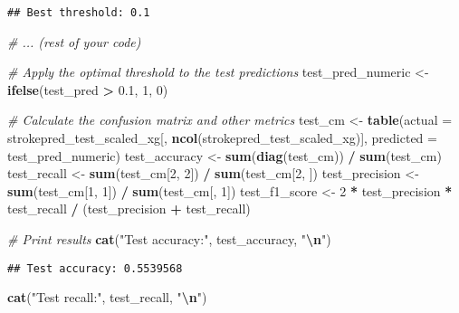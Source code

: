 \documentclass[
]{article}
\newenvironment{Shaded}{\begin{snugshade}}{\end{snugshade}}
\newcommand{\AttributeTok}[1]{\textcolor[rgb]{0.13,0.29,0.53}{#1}}
\newcommand{\CommentTok}[1]{\textcolor[rgb]{0.56,0.35,0.01}{\textit{#1}}}
\newcommand{\DecValTok}[1]{\textcolor[rgb]{0.00,0.00,0.81}{#1}}
\newcommand{\FloatTok}[1]{\textcolor[rgb]{0.00,0.00,0.81}{#1}}
\newcommand{\FunctionTok}[1]{\textcolor[rgb]{0.13,0.29,0.53}{\textbf{#1}}}
\newcommand{\NormalTok}[1]{#1}
\newcommand{\OtherTok}[1]{\textcolor[rgb]{0.56,0.35,0.01}{#1}}
\newcommand{\SpecialCharTok}[1]{\textcolor[rgb]{0.81,0.36,0.00}{\textbf{#1}}}
\newcommand{\StringTok}[1]{\textcolor[rgb]{0.31,0.60,0.02}{#1}}
\begin{document}
\begin{verbatim}
## Best threshold: 0.1
\end{verbatim}

\begin{Shaded}
\begin{Highlighting}[]
\CommentTok{\# ... (rest of your code)}

\CommentTok{\# Apply the optimal threshold to the test predictions}
\NormalTok{test\_pred\_numeric }\OtherTok{\textless{}{-}} \FunctionTok{ifelse}\NormalTok{(test\_pred }\SpecialCharTok{\textgreater{}} \FloatTok{0.1}\NormalTok{, }\DecValTok{1}\NormalTok{, }\DecValTok{0}\NormalTok{)}

\CommentTok{\# Calculate the confusion matrix and other metrics}
\NormalTok{test\_cm }\OtherTok{\textless{}{-}} \FunctionTok{table}\NormalTok{(}\AttributeTok{actual =}\NormalTok{ strokepred\_test\_scaled\_xg[, }\FunctionTok{ncol}\NormalTok{(strokepred\_test\_scaled\_xg)], }\AttributeTok{predicted =}\NormalTok{ test\_pred\_numeric)}
\NormalTok{test\_accuracy }\OtherTok{\textless{}{-}} \FunctionTok{sum}\NormalTok{(}\FunctionTok{diag}\NormalTok{(test\_cm)) }\SpecialCharTok{/} \FunctionTok{sum}\NormalTok{(test\_cm)}
\NormalTok{test\_recall }\OtherTok{\textless{}{-}} \FunctionTok{sum}\NormalTok{(test\_cm[}\DecValTok{2}\NormalTok{, }\DecValTok{2}\NormalTok{]) }\SpecialCharTok{/} \FunctionTok{sum}\NormalTok{(test\_cm[}\DecValTok{2}\NormalTok{, ])}
\NormalTok{test\_precision }\OtherTok{\textless{}{-}} \FunctionTok{sum}\NormalTok{(test\_cm[}\DecValTok{1}\NormalTok{, }\DecValTok{1}\NormalTok{]) }\SpecialCharTok{/} \FunctionTok{sum}\NormalTok{(test\_cm[, }\DecValTok{1}\NormalTok{])}
\NormalTok{test\_f1\_score }\OtherTok{\textless{}{-}} \DecValTok{2} \SpecialCharTok{*}\NormalTok{ test\_precision }\SpecialCharTok{*}\NormalTok{ test\_recall }\SpecialCharTok{/}\NormalTok{ (test\_precision }\SpecialCharTok{+}\NormalTok{ test\_recall)}

\CommentTok{\# Print results}
\FunctionTok{cat}\NormalTok{(}\StringTok{"Test accuracy:"}\NormalTok{, test\_accuracy, }\StringTok{"}\SpecialCharTok{\textbackslash{}n}\StringTok{"}\NormalTok{)}
\end{Highlighting}
\end{Shaded}

\begin{verbatim}
## Test accuracy: 0.5539568
\end{verbatim}

\begin{Shaded}
\begin{Highlighting}[]
\FunctionTok{cat}\NormalTok{(}\StringTok{"Test recall:"}\NormalTok{, test\_recall, }\StringTok{"}\SpecialCharTok{\textbackslash{}n}\StringTok{"}\NormalTok{)}
\end{Highlighting}
\end{Shaded}
\end{document}
